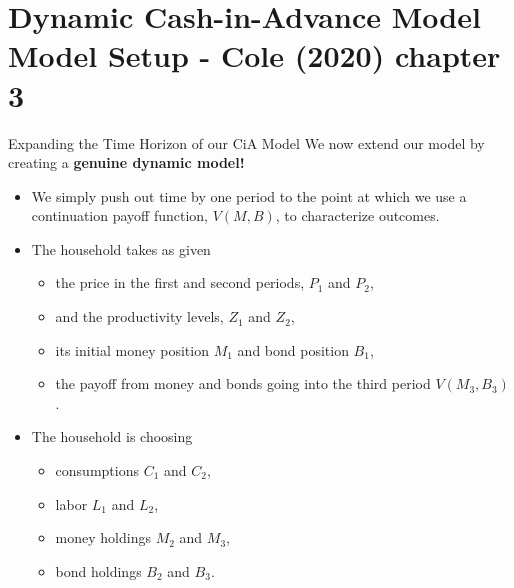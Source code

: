 \documentclass[10pt,c,aspectratio=1610,handout]{beamer}
\begin{document}
\section{Dynamic Cash-in-Advance Model\\\small{Model Setup - Cole (2020) chapter 3}}%
\begin{frame}{Expanding the Time Horizon of our CiA Model}%
  We now extend our model by creating a \textbf{genuine dynamic model!}%
  \begin{itemize}%
    \item[$\blacktriangleright$] We simply push out time by one period to the point at which we use a continuation payoff function, $V(M,B)$, to characterize outcomes.%
    \pause%
    \item[$\blacktriangleright$] The household takes as given%
    \begin{small}%
      \begin{itemize}%
        \item[$\rightarrow$] the price in the first and second periods, $P_{1}$ and $P_{2}$,%
        \item[$\rightarrow$] and the productivity levels, $Z_{1}$ and $Z_{2}$,%
        \item[$\rightarrow$] its initial money position $M_{1}$ and bond position $B_{1}$,%
        \item[$\rightarrow$] the payoff from money and bonds going into the third period $V(M_{3},B_{3})$.%
      \end{itemize}%
    \end{small}%
    \pause%
    \item[$\blacktriangleright$] The household is choosing%
    \begin{small}%
      \begin{itemize}%
        \item[$\rightarrow$] consumptions $C_{1}$ and $C_{2}$,%
        \item[$\rightarrow$] labor $L_{1}$ and $L_{2}$,%
        \item[$\rightarrow$] money holdings $M_{2}$ and $M_{3}$,%
        \item[$\rightarrow$] bond holdings $B_{2}$ and $B_{3}$.%
      \end{itemize}%

\end{small}
\end{itemize}
\end{frame}
\end{document}
